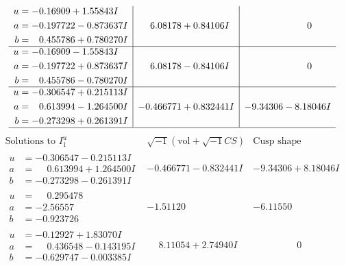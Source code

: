 \documentclass[1p]{elsarticle_modified}
\theoremstyle{definition}
\newcommand{\I}{\sqrt{-1}}
\begin{document}
$$\begin{array}{c|c|c}
\begin{aligned}
u &= -0.16909 + 1.55843 I \\
a &= -0.197722 - 0.873637 I \\
b &= \phantom{-}0.455786 + 0.780270 I\end{aligned}
 & \phantom{-}6.08178 + 0.84106 I & \phantom{-0.000000 } 0 \\ \hline\begin{aligned}
u &= -0.16909 - 1.55843 I \\
a &= -0.197722 + 0.873637 I \\
b &= \phantom{-}0.455786 - 0.780270 I\end{aligned}
 & \phantom{-}6.08178 - 0.84106 I & \phantom{-0.000000 } 0 \\ \hline\begin{aligned}
u &= -0.306547 + 0.215113 I \\
a &= \phantom{-}0.613994 - 1.264500 I \\
b &= -0.273298 + 0.261391 I\end{aligned}
 & -0.466771 + 0.832441 I & -9.34306 - 8.18046 I\\
 \hline 
 \end{array}$$\newpage$$\begin{array}{c|c|c}  
\text{Solutions to }I^u_{1}& \I (\text{vol} + \sqrt{-1}CS) & \text{Cusp shape}\\
 \hline 
\begin{aligned}
u &= -0.306547 - 0.215113 I \\
a &= \phantom{-}0.613994 + 1.264500 I \\
b &= -0.273298 - 0.261391 I\end{aligned}
 & -0.466771 - 0.832441 I & -9.34306 + 8.18046 I \\ \hline\begin{aligned}
u &= \phantom{-}0.295478\phantom{ +0.000000I} \\
a &= -2.56557\phantom{ +0.000000I} \\
b &= -0.923726\phantom{ +0.000000I}\end{aligned}
 & -1.51120\phantom{ +0.000000I} & -6.11550\phantom{ +0.000000I} \\ \hline\begin{aligned}
u &= -0.12927 + 1.83070 I \\
a &= \phantom{-}0.436548 - 0.143195 I \\
b &= -0.629747 - 0.003385 I\end{aligned}
 & \phantom{-}8.11054 + 2.74940 I & \phantom{-0.000000 } 0 \\ \hline\begin{aligned}

\end{aligned}
\end{array}$$
\end{document}
